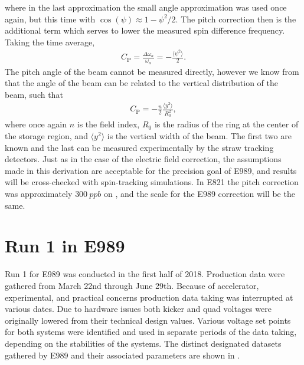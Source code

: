 where in the last approximation the small angle approximation was used once again, but this time with $\cos(\psi) \approx 1 - \psi^{2}/2$. The pitch correction then is the additional term which serves to lower the measured spin difference frequency. Taking the time average,
        \begin{align}
            C_{\text{P}} = \frac{\Delta\omega_{a}}{\omega_{a}} = - \frac{\langle \psi^{2} \rangle}{2}.
        \end{align}
The pitch angle of the beam cannot be measured directly, however we know from  that the angle of the beam can be related to the vertical distribution of the beam, such that 
        \begin{align}
            C_{\text{P}} = - \frac{n}{2} \frac{\langle y^{2} \rangle}{R_{0}^{2}},
        \end{align}
where once again $n$ is the field index, $R_{0}$ is the radius of the ring at the center of the storage region, and $\langle y^{2} \rangle$ is the vertical width of the beam. The first two are known and the last can be measured experimentally by the straw tracking detectors. Just as in the case of the electric field correction, the assumptions made in this derivation are acceptable for the precision goal of E989, and results will be cross-checked with spin-tracking simulations. In E821 the pitch correction was approximately $\SI{300}{ppb}$ on \wa \cite{E821FinalReport}, and the scale for the E989 correction will be the same.




\section{Run 1 in E989}
\label{sec:Run1}


Run 1 for E989 was conducted in the first half of 2018. Production data were gathered from March 22nd through June 29th. Because of accelerator, experimental, and practical concerns production data taking was interrupted at various dates. Due to hardware issues both kicker and quad voltages were originally lowered from their technical design values. Various voltage set points for both systems were identified and used in separate periods of the data taking, depending on the stabilities of the systems. The distinct designated datasets gathered by E989 and their associated parameters are shown in . 

